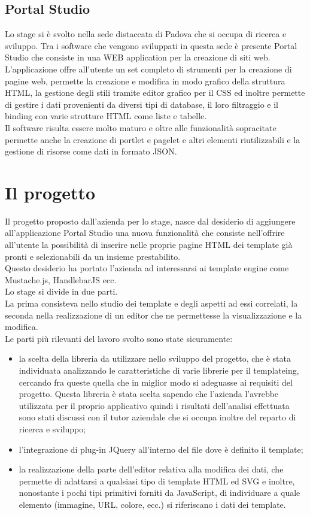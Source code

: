 \subsection{Portal Studio}
Lo stage si è svolto nella sede distaccata di Padova che si occupa di ricerca e sviluppo.
Tra i software che vengono sviluppati in questa sede è presente Portal Studio che consiste in una WEB application per la creazione di siti web.\\
L'applicazione offre all'utente un set completo di strumenti per la creazione di pagine web, permette la creazione e modifica in modo grafico della struttura HTML, la gestione degli stili tramite editor grafico per il CSS ed inoltre permette di gestire i dati provenienti da diversi tipi di database, il loro filtraggio e il binding con varie strutture HTML come liste e tabelle.\\
Il software risulta essere molto maturo e oltre alle funzionalità sopracitate permette anche la creazione di portlet e pagelet e altri elementi riutilizzabili e la gestione di risorse come dati in formato JSON.


\section{Il progetto}
Il progetto proposto dall'azienda per lo stage, nasce dal desiderio di aggiungere all'applicazione Portal Studio una nuova funzionalità che consiste nell'offrire all'utente la possibilità di inserire nelle proprie pagine HTML dei template già pronti e selezionabili da un insieme prestabilito.\\
Questo desiderio ha portato l'azienda ad interessarsi ai template engine come Mustache.js, HandlebarJS ecc.\\
Lo stage si divide in due parti.\\
La prima consisteva nello studio dei template e degli aspetti ad essi correlati, la seconda nella realizzazione di un editor che ne permettesse la visualizzazione e la modifica.\\
Le parti più rilevanti del lavoro svolto sono state sicuramente:
\begin{itemize}
	\item la scelta della libreria da utilizzare nello sviluppo del progetto, che è stata individuata analizzando le caratteristiche di varie librerie per il templateing, cercando fra queste quella che in miglior modo si adeguasse ai requisiti del progetto.
	Questa libreria è stata scelta sapendo che l'azienda l'avrebbe utilizzata per il proprio applicativo quindi i risultati dell'analisi effettuata sono stati discussi con il tutor aziendale che si occupa inoltre del reparto di ricerca e sviluppo;
	\item l'integrazione di plug-in JQuery all'interno del file dove è definito il template;
	\item la realizzazione della parte dell'editor relativa alla modifica dei dati, che permette di adattarsi a qualsiasi tipo di template HTML ed SVG e inoltre, nonostante i pochi tipi primitivi forniti da JavaScript, di individuare a quale elemento (immagine, URL, colore, ecc.) si riferiscano i dati dei template.  
\end{itemize}

